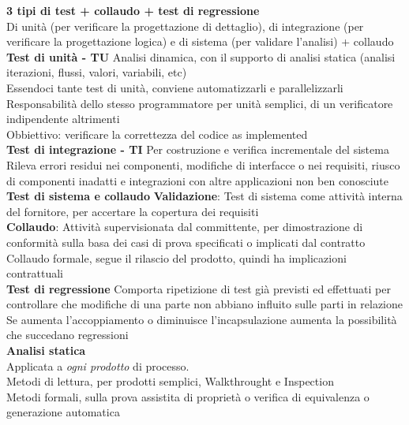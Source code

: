 \documentclass{article}
\begin{document}
				\textbf{3 tipi di test + collaudo + test di regressione}\\
				Di unità (per verificare la progettazione di dettaglio), di integrazione (per verificare la progettazione logica) e di sistema (per validare l'analisi) + collaudo\\
				
				\textbf{Test di unità - TU}
				Analisi dinamica, con il supporto di analisi statica (analisi iterazioni, flussi, valori, variabili, etc)\\
				Essendoci tante test di unità, conviene automatizzarli e parallelizzarli\\
				Responsabilità dello stesso programmatore per unità semplici, di un verificatore indipendente altrimenti\\
				Obbiettivo: verificare la correttezza del codice as implemented\\
				
				\textbf{Test di integrazione - TI}
				Per costruzione e verifica incrementale del sistema\\
				Rileva errori residui nei componenti, modifiche di interfacce o nei requisiti, riusco di componenti inadatti e integrazioni con altre applicazioni non ben conosciute\\
				
				\textbf{Test di sistema e collaudo}
				\textbf{Validazione}: Test di sistema come attività interna del fornitore, per accertare la copertura dei requisiti\\
				\textbf{Collaudo}: Attività supervisionata dal committente, per dimostrazione di conformità sulla basa dei casi di prova specificati o implicati dal contratto\\
				Collaudo formale, segue il rilascio del prodotto, quindi ha implicazioni contrattuali\\
				
				\textbf{Test di regressione}
				Comporta ripetizione di test già previsti ed effettuati per controllare che modifiche di una parte non abbiano influito sulle parti in relazione\\
				Se aumenta l'accoppiamento o diminuisce l'incapsulazione aumenta la possibilità che succedano regressioni\\
				
				\textbf{Analisi statica}\\
				Applicata a \textit{ogni prodotto} di processo.\\
				Metodi di lettura, per prodotti semplici, Walkthrought e Inspection\\
				Metodi formali, sulla prova assistita di proprietà o verifica di equivalenza o generazione automatica\\
				
\end{document}
